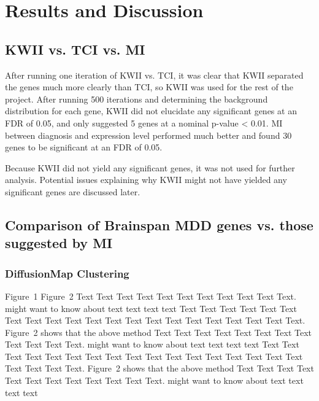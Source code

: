 \documentclass{bioinfo}
\begin{document}
\section{Results and Discussion}

\subsection{KWII vs. TCI vs. MI}
After running one iteration of KWII vs. TCI, it was clear that KWII separated the genes much more clearly than TCI, so KWII was used for the rest of the project.  After running 500 iterations and determining the background distribution for each gene, KWII did not elucidate any significant genes at an FDR of 0.05, and only suggested 5 genes at a nominal p-value < 0.01.  MI between diagnosis and expression level performed much better and found 30 genes to be significant at an FDR of
0.05.

Because KWII did not yield any significant genes, it was not used for further analysis.  Potential issues explaining why KWII might not have yielded any significant genes are discussed later.

\subsection{Comparison of Brainspan MDD genes vs. those suggested by MI}

\subsubsection{DiffusionMap Clustering}

Figure~1\vphantom{\ref{fig:01}}
Figure~2\vphantom{\ref{fig:01}}
Text Text Text  Text Text Text Text Text Text  Text Text.
\citealp{Boffelli03} might want to know about  text text text text
Text Text Text Text Text Text Text Text Text Text Text Text Text
Text Text  Text Text Text Text Text Text.
Figure~2\vphantom{\ref{fig:02}} shows that the above method  Text
Text Text Text Text Text Text Text Text Text  Text Text.
\citealp{Boffelli03} might want to know about text text text text
Text Text Text Text Text Text  Text Text Text Text Text Text Text
Text Text Text Text Text Text Text Text.
Figure~2\vphantom{\ref{fig:02}} shows that the above method  Text
Text Text Text Text Text Text Text Text Text  Text Text.
\citealp{Boffelli03} might want to know about text text text
text\vspace*{1pt}
\end{document}
